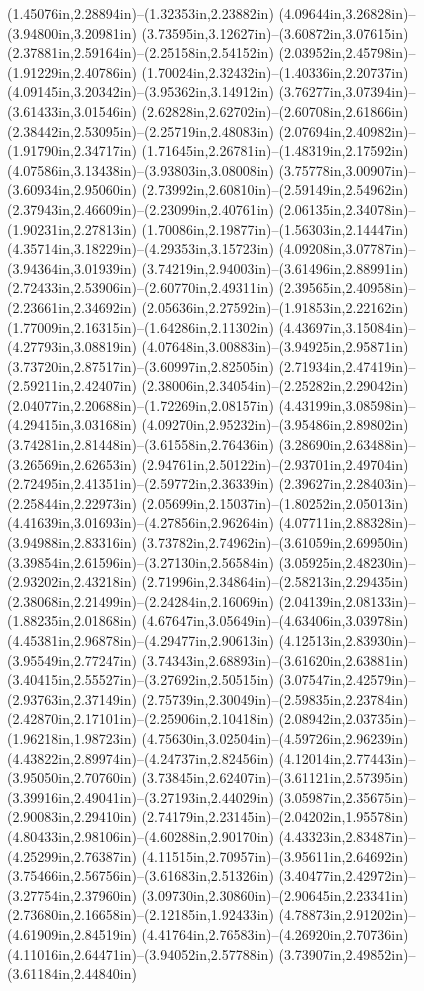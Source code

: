 (1.45076in,2.28894in)--(1.32353in,2.23882in) (4.09644in,3.26828in)--(3.94800in,3.20981in) (3.73595in,3.12627in)--(3.60872in,3.07615in) (2.37881in,2.59164in)--(2.25158in,2.54152in) (2.03952in,2.45798in)--(1.91229in,2.40786in) (1.70024in,2.32432in)--(1.40336in,2.20737in) (4.09145in,3.20342in)--(3.95362in,3.14912in) (3.76277in,3.07394in)--(3.61433in,3.01546in) (2.62828in,2.62702in)--(2.60708in,2.61866in) (2.38442in,2.53095in)--(2.25719in,2.48083in) (2.07694in,2.40982in)--(1.91790in,2.34717in) (1.71645in,2.26781in)--(1.48319in,2.17592in) (4.07586in,3.13438in)--(3.93803in,3.08008in) (3.75778in,3.00907in)--(3.60934in,2.95060in) (2.73992in,2.60810in)--(2.59149in,2.54962in) (2.37943in,2.46609in)--(2.23099in,2.40761in) (2.06135in,2.34078in)--(1.90231in,2.27813in) (1.70086in,2.19877in)--(1.56303in,2.14447in) (4.35714in,3.18229in)--(4.29353in,3.15723in) (4.09208in,3.07787in)--(3.94364in,3.01939in) (3.74219in,2.94003in)--(3.61496in,2.88991in) (2.72433in,2.53906in)--(2.60770in,2.49311in) (2.39565in,2.40958in)--(2.23661in,2.34692in) (2.05636in,2.27592in)--(1.91853in,2.22162in) (1.77009in,2.16315in)--(1.64286in,2.11302in) (4.43697in,3.15084in)--(4.27793in,3.08819in) (4.07648in,3.00883in)--(3.94925in,2.95871in) (3.73720in,2.87517in)--(3.60997in,2.82505in) (2.71934in,2.47419in)--(2.59211in,2.42407in) (2.38006in,2.34054in)--(2.25282in,2.29042in) (2.04077in,2.20688in)--(1.72269in,2.08157in) (4.43199in,3.08598in)--(4.29415in,3.03168in) (4.09270in,2.95232in)--(3.95486in,2.89802in) (3.74281in,2.81448in)--(3.61558in,2.76436in) (3.28690in,2.63488in)--(3.26569in,2.62653in) (2.94761in,2.50122in)--(2.93701in,2.49704in) (2.72495in,2.41351in)--(2.59772in,2.36339in) (2.39627in,2.28403in)--(2.25844in,2.22973in) (2.05699in,2.15037in)--(1.80252in,2.05013in) (4.41639in,3.01693in)--(4.27856in,2.96264in) (4.07711in,2.88328in)--(3.94988in,2.83316in) (3.73782in,2.74962in)--(3.61059in,2.69950in) (3.39854in,2.61596in)--(3.27130in,2.56584in) (3.05925in,2.48230in)--(2.93202in,2.43218in) (2.71996in,2.34864in)--(2.58213in,2.29435in) (2.38068in,2.21499in)--(2.24284in,2.16069in) (2.04139in,2.08133in)--(1.88235in,2.01868in) (4.67647in,3.05649in)--(4.63406in,3.03978in) (4.45381in,2.96878in)--(4.29477in,2.90613in) (4.12513in,2.83930in)--(3.95549in,2.77247in) (3.74343in,2.68893in)--(3.61620in,2.63881in) (3.40415in,2.55527in)--(3.27692in,2.50515in) (3.07547in,2.42579in)--(2.93763in,2.37149in) (2.75739in,2.30049in)--(2.59835in,2.23784in) (2.42870in,2.17101in)--(2.25906in,2.10418in) (2.08942in,2.03735in)--(1.96218in,1.98723in) (4.75630in,3.02504in)--(4.59726in,2.96239in) (4.43822in,2.89974in)--(4.24737in,2.82456in) (4.12014in,2.77443in)--(3.95050in,2.70760in) (3.73845in,2.62407in)--(3.61121in,2.57395in) (3.39916in,2.49041in)--(3.27193in,2.44029in) (3.05987in,2.35675in)--(2.90083in,2.29410in) (2.74179in,2.23145in)--(2.04202in,1.95578in) (4.80433in,2.98106in)--(4.60288in,2.90170in) (4.43323in,2.83487in)--(4.25299in,2.76387in) (4.11515in,2.70957in)--(3.95611in,2.64692in) (3.75466in,2.56756in)--(3.61683in,2.51326in) (3.40477in,2.42972in)--(3.27754in,2.37960in) (3.09730in,2.30860in)--(2.90645in,2.23341in) (2.73680in,2.16658in)--(2.12185in,1.92433in) (4.78873in,2.91202in)--(4.61909in,2.84519in) (4.41764in,2.76583in)--(4.26920in,2.70736in) (4.11016in,2.64471in)--(3.94052in,2.57788in) (3.73907in,2.49852in)--(3.61184in,2.44840in) 